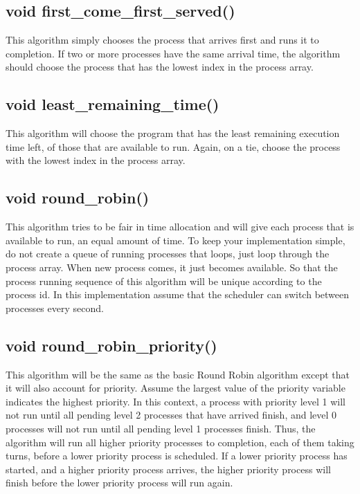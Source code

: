 \documentclass[letterpaper,10pt]{article}
\begin{document}
\subsection{void first\_come\_first\_served()}
This algorithm simply chooses the process that arrives first and runs it to completion. If two or
more processes have the same arrival time, the algorithm should choose the process that has
the lowest index in the process array.

\subsection{void least\_remaining\_time()}
This algorithm will choose the program that has the least remaining execution time left,
of those that are available to run. Again, on a tie, choose the process with the lowest
index in the process array.

\subsection{void round\_robin()}
This algorithm tries to be fair in time allocation and will give each process that is available to
run, an equal amount of time. To keep your implementation simple, do not create a queue of
running processes that loops, just loop through the process array. When new process comes, it
just becomes available. So that the process running sequence of this algorithm will be unique
according to the process id. In this implementation assume that the scheduler can switch
between processes every second.

\subsection{void round\_robin\_priority()}
This algorithm will be the same as the basic Round Robin algorithm except that it will also
account for priority. Assume the largest value of the priority variable indicates the highest
priority. In this context, a process with priority level 1 will not run until all pending level 2
processes that have arrived finish, and level 0 processes will not run until all pending level 1
processes finish. Thus, the algorithm will run all higher priority processes to completion, each of
them taking turns, before a lower priority process is scheduled. If a lower priority process has
started, and a higher priority process arrives, the higher priority process will finish before the
lower priority process will run again.
\end{document}
